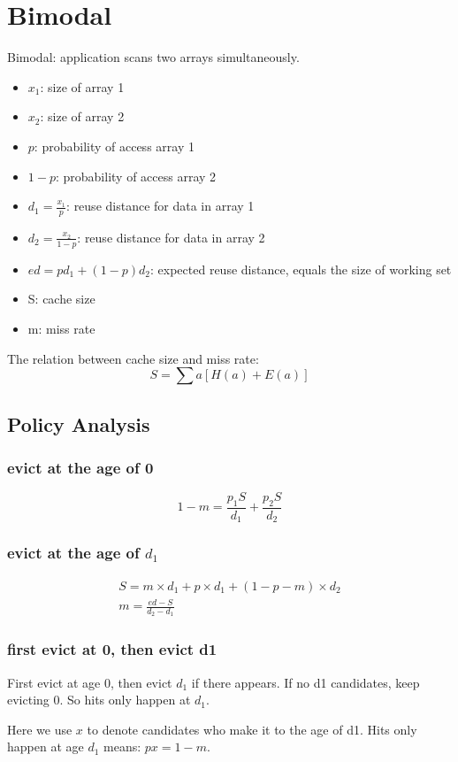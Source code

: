 \section{Bimodal}

Bimodal: application scans two arrays simultaneously.

\begin{itemize}
\item $x_1$: size of array 1
\item $x_2$: size of array 2
\item $p$: probability of access array 1
\item $1-p$: probability of access array 2
\item $d_1 = \frac{x_1}{p}$: reuse distance for data in array 1
\item $d_2 = \frac{x_2}{1-p}$: reuse distance for data in array 2
\item $ed = p d_1 + (1-p) d_2$: expected reuse distance, equals the size of
working set 
\item S: cache size
\item m: miss rate
\end{itemize}

The relation between cache size and miss rate:
\begin{equation}
S = \sum a [H(a) + E(a)]
\end{equation}

\subsection{Policy Analysis}

\subsubsection{evict at the age of 0}

\begin{equation}
1-m = \frac{p_1 S}{d_1} + \frac{p_2 S}{d_2}
\end{equation}

\subsubsection{evict at the age of $d_1$}

\begin{equation}
\begin{gathered}
S = m \times d_1 + p \times d_1 + (1-p-m) \times d_2 \\
m = \frac{ed - S}{d_2-d_1}
\end{gathered}
\end{equation}

\subsubsection{first evict at 0, then evict d1}
First evict at age 0, then evict $d_1$ if there appears. If no d1 candidates,
keep evicting 0. So hits only happen at $d_1$.

Here we use $x$ to denote candidates who make it to the age of d1. Hits only
happen at age $d_1$ means: \st{$px = 1-m$}.
